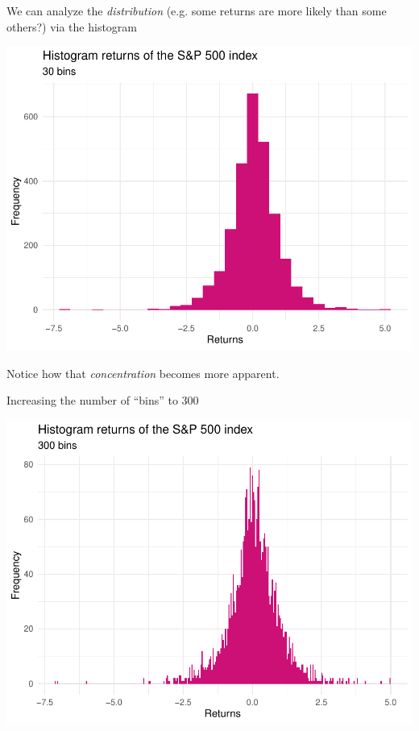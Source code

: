 \documentclass[notes=show,smaller]{beamer}\usepackage[]{graphicx}\usepackage[]{color}
\newenvironment{knitrout}{}{} %
\begin{document}
\begin{frame}{\secname}
  \begin{example}[continued]

  We can analyze the \emph{distribution} (e.g. some returns are more likely than some others?) via the histogram

\begin{knitrout}
\color{fgcolor}

{\centering \includegraphics[width=0.5\linewidth]{figure/unnamed-chunk-4-1} 

}



\end{knitrout}

Notice how that \emph{concentration} becomes more apparent.

  \end{example}
\end{frame}


\begin{frame}{\secname}
  \begin{example}[continued]
  Increasing the number of ``bins'' to 300

\begin{knitrout}
\color{fgcolor}

{\centering \includegraphics[width=0.5\linewidth]{figure/unnamed-chunk-5-1} 

}



\end{knitrout}
  \end{example}
\end{frame}
\end{document}

